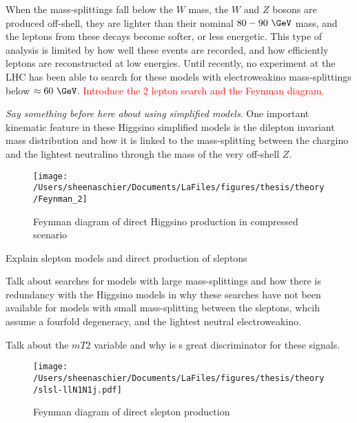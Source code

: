 When the mass-splittings fall below the $W$ mass, the $W$ and $Z$ bosons are produced off-shell, they are lighter than their nominal $80-90~\GeV$ mass, and the leptons from these decays become softer, or less energetic.  This type of analysis is limited by how well these events are recorded, and how efficiently leptons are reconstructed at low energies.  Until recently, no experiment at the LHC has been able to search for these models with electroweakino mass-splittings below $\approx 60~\GeV$.  \textcolor{red}{Introduce the 2 lepton search and the Feynman diagram.}

\textit{Say something before here about using simplified models}.
One important kinematic feature in these Higgsino simplified models is the dilepton invariant mass distribution and how it is linked to the mass-splitting between the chargino and the lightest neutralino through the mass of the very off-shell $Z$.

 \begin{figure}%
  \begin{center}
  \texttt{[image: /Users/sheenaschier/Documents/LaFiles/figures/thesis/theory/Feynman\_2]}
   \end{center}
 \caption{Feynman diagram of direct Higgsino production in compressed scenario}
 \label{fig:fn1}
 \end{figure}
 \FloatBarrier
 Explain slepton models and direct production of sleptons
 
 Talk about searches for models with large mass-splittings and how there is redundancy with the Higgsino models in why these searches have not been available for models with small mass-splitting between the sleptons, whcih assume a fourfold degeneracy, and the lightest neutral electroweakino.
 
 Talk about the $m{T2}$ variable and why is s great discriminator for these signals.
 
  \begin{figure}%
  \begin{center}
  \texttt{[image: /Users/sheenaschier/Documents/LaFiles/figures/thesis/theory/slsl-llN1N1j.pdf]}
   \end{center}
 \caption{Feynman diagram of direct slepton production}
 \label{fig:fn1}
 \end{figure}